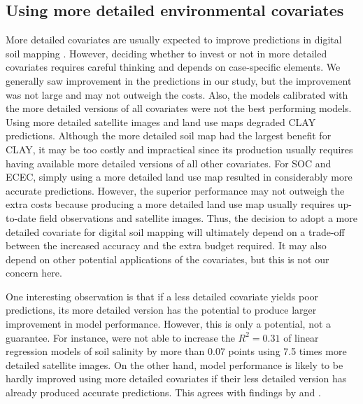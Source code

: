\subsection{Using more detailed environmental covariates}

More detailed covariates are usually expected to improve predictions in digital 
soil mapping \citep{CavazziEtAl2013, MaynardEtAl2014}. However, deciding whether
to invest or not in more detailed covariates requires careful thinking and 
depends on case-specific elements. We generally saw improvement in the 
predictions in our study, but the improvement was not large and may not outweigh
the costs. Also, the models calibrated with the more detailed versions of all 
covariates were not the best performing models. Using more detailed satellite 
images and land use maps degraded CLAY predictions. Although the more detailed
soil map had the largest benefit for CLAY, it may be too costly and impractical 
since its production usually requires having available more detailed versions 
of all other covariates. For SOC and ECEC, simply using a more detailed land 
use map resulted in considerably more accurate predictions. However, the 
superior performance may not outweigh the extra costs because producing a more 
detailed land use map usually requires up-to-date field observations and 
satellite images. Thus, the decision to adopt a more detailed covariate for 
digital soil mapping will ultimately depend on a trade-off between the increased
accuracy and the extra budget required. It may also depend on other potential 
applications of the covariates, but this is not our concern here.

One interesting observation is that if a less detailed covariate yields poor 
predictions, its more detailed version has the potential to produce larger 
improvement in model performance. However, this is only a potential, not a 
guarantee. For instance, \citet{EldeiryEtAl2008} were not able to increase the 
$R^2 = 0.31$ of linear regression models of soil salinity by more than 0.07 
points using 7.5 times more detailed satellite images. On the other hand, model 
performance is likely to be hardly improved using more detailed covariates if 
their less detailed version has already produced accurate predictions. This 
agrees with findings by \citet{ThompsonEtAl2001} and \citet{KimEtAl2014}.

